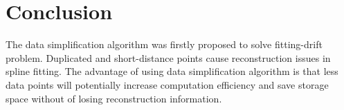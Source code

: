 \section{Conclusion}

The data simplification algorithm was firstly proposed to solve fitting-drift problem. Duplicated and short-distance points cause reconstruction issues in spline fitting. The advantage of using data simplification algorithm is that less data points will potentially increase computation efficiency and save storage space without of losing reconstruction information.  













